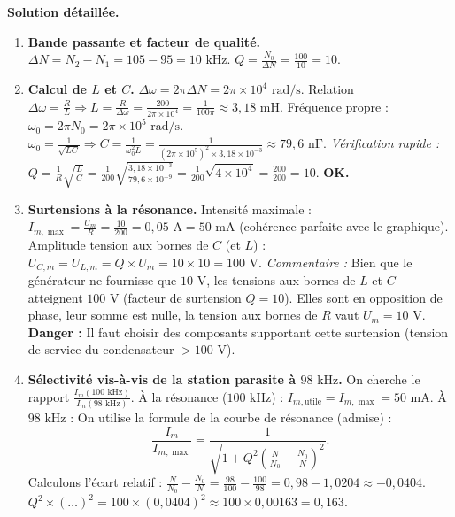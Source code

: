 \documentclass[11pt]{article}
\begin{document}
\begin{exoresolu}
\begin{enumerate}
\end{enumerate}
\tcblower
\textbf{Solution détaillée.}
\begin{enumerate}
    \item \textbf{Bande passante et facteur de qualité.}
    $\Delta N = N_2 - N_1 = 105 - 95 = \boxed{10 \text{ kHz}}$.
    $Q = \frac{N_0}{\Delta N} = \frac{100}{10} = \boxed{10}$.
    \item \textbf{Calcul de $L$ et $C$.}
    $\Delta\omega = 2\pi\Delta N = 2\pi \times 10^4 \text{ rad/s}$.
    Relation $\Delta\omega = \frac{R}{L} \Rightarrow L = \frac{R}{\Delta\omega} = \frac{200}{2\pi \times 10^4} = \frac{1}{100\pi} \approx \boxed{3,18 \text{ mH}}$.
    Fréquence propre : $\omega_0 = 2\pi N_0 = 2\pi \times 10^5 \text{ rad/s}$.
    $\omega_0 = \frac{1}{\sqrt{LC}} \Rightarrow C = \frac{1}{\omega_0^2 L} = \frac{1}{(2\pi \times 10^5)^2 \times 3,18\times 10^{-3}} \approx \boxed{79,6 \text{ nF}}$.
    \textit{Vérification rapide :} $Q = \frac{1}{R}\sqrt{\frac{L}{C}} = \frac{1}{200}\sqrt{\frac{3,18\times 10^{-3}}{79,6\times 10^{-9}}} = \frac{1}{200}\sqrt{4\times 10^4} = \frac{200}{200} = 10$. \textbf{OK.}
    \item \textbf{Surtensions à la résonance.}
    Intensité maximale : $I_{m,\max} = \frac{U_m}{R} = \frac{10}{200} = 0,05 \text{ A} = 50 \text{ mA}$ (cohérence parfaite avec le graphique).
    Amplitude tension aux bornes de $C$ (et $L$) : $U_{C,m} = U_{L,m} = Q \times U_m = 10 \times 10 = \boxed{100 \text{ V}}$.
    \textit{Commentaire :} Bien que le générateur ne fournisse que $10 \text{ V}$, les tensions aux bornes de $L$ et $C$ atteignent $100 \text{ V}$ (facteur de surtension $Q=10$). Elles sont en opposition de phase, leur somme est nulle, la tension aux bornes de $R$ vaut $U_m = 10 \text{ V}$. \textbf{Danger :} Il faut choisir des composants supportant cette surtension (tension de service du condensateur $> 100 \text{ V}$).
    \item \textbf{Sélectivité vis-à-vis de la station parasite à $98 \text{ kHz}$.}
    On cherche le rapport $\frac{I_m(100 \text{ kHz})}{I_m(98 \text{ kHz})}$.
    À la résonance ($100 \text{ kHz}$) : $I_{m,\text{utile}} = I_{m,\max} = 50 \text{ mA}$.
    À $98 \text{ kHz}$ : On utilise la formule de la courbe de résonance (admise) :
    \[
    \frac{I_m}{I_{m,\max}} = \frac{1}{\sqrt{1 + Q^2\left(\frac{N}{N_0} - \frac{N_0}{N}\right)^2}}.
    \]
    Calculons l'écart relatif : $\frac{N}{N_0} - \frac{N_0}{N} = \frac{98}{100} - \frac{100}{98} = 0,98 - 1,0204 \approx -0,0404$.
    $Q^2 \times (\dots)^2 = 100 \times (0,0404)^2 \approx 100 \times 0,00163 = 0,163$.

\end{enumerate}
\end{exoresolu}
\end{document}
